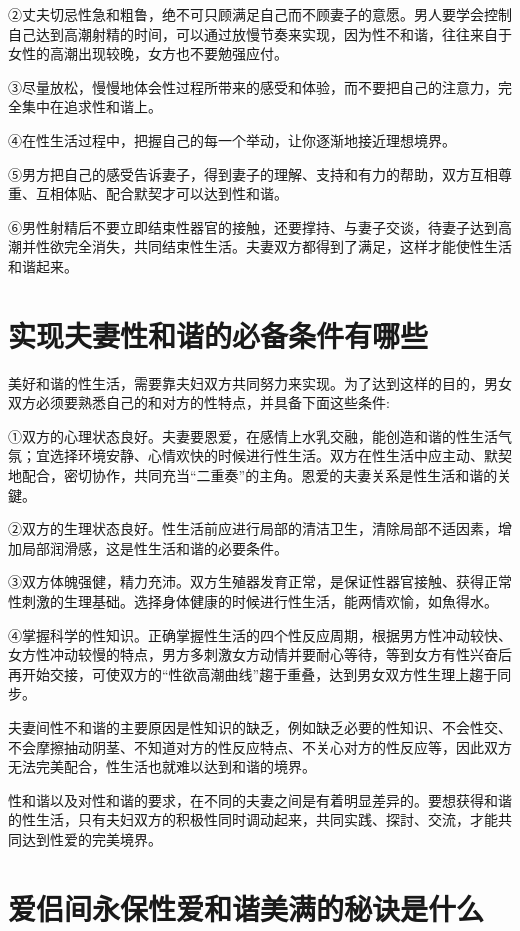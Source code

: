 \documentclass[12pt,UTF8]{ctexbook}
\begin{document}
②丈夫切忌性急和粗鲁，绝不可只顾满足自己而不顾妻子的意愿。男人要学会控制自己达到高潮射精的时间，可以通过放慢节奏来实现，因为性不和谐，往往来自于女性的高潮出现较晚，女方也不要勉强应付。

③尽量放松，慢慢地体会性过程所带来的感受和体验，而不要把自己的注意力，完全集中在追求性和谐上。

④在性生活过程中，把握自己的每一个举动，让你逐渐地接近理想境界。

⑤男方把自己的感受告诉妻子，得到妻子的理解、支持和有力的帮助，双方互相尊重、互相体贴、配合默契才可以达到性和谐。

⑥男性射精后不要立即结束性器官的接触，还要撑持、与妻子交谈，待妻子达到高潮并性欲完全消失，共同结束性生活。夫妻双方都得到了满足，这样才能使性生活和谐起来。

\section{实现夫妻性和谐的必备条件有哪些}

美好和谐的性生活，需要靠夫妇双方共同努力来实现。为了达到这样的目的，男女双方必须要熟悉自己的和对方的性特点，并具备下面这些条件:

①双方的心理状态良好。夫妻要恩爱，在感情上水乳交融，能创造和谐的性生活气氛；宜选择环境安静、心情欢快的时候进行性生活。双方在性生活中应主动、默契地配合，密切协作，共同充当“二重奏”的主角。恩爱的夫妻关系是性生活和谐的关鍵。

②双方的生理状态良好。性生活前应进行局部的清洁卫生，清除局部不适因素，增加局部润滑感，这是性生活和谐的必要条件。

③双方体魄强健，精力充沛。双方生殖器发育正常，是保证性器官接触、获得正常性刺激的生理基础。选择身体健康的时候进行性生活，能两情欢愉，如魚得水。

④掌握科学的性知识。正确掌握性生活的四个性反应周期，根据男方性冲动较快、女方性冲动较慢的特点，男方多刺激女方动情并要耐心等待，等到女方有性兴奋后再开始交接，可使双方的“性欲高潮曲线”趨于重叠，达到男女双方性生理上趨于同步。

夫妻间性不和谐的主要原因是性知识的缺乏，例如缺乏必要的性知识、不会性交、不会摩擦抽动阴茎、不知道对方的性反应特点、不关心对方的性反应等，因此双方无法完美配合，性生活也就难以达到和谐的境界。

性和谐以及对性和谐的要求，在不同的夫妻之间是有着明显差异的。要想获得和谐的性生活，只有夫妇双方的积极性同时调动起来，共同实践、探討、交流，才能共同达到性爱的完美境界。

\section{爱侣间永保性爱和谐美满的秘诀是什么}
\end{document}
